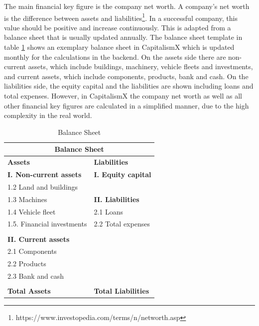 The main financial key figure is the company net worth. A company's net worth is the difference between assets and liabilities\footnote{https://www.investopedia.com/terms/n/networth.asp}. In a successful company, this value should be positive and increase continuously. This is adapted from a balance sheet that is usually updated annually. The balance sheet template in table \ref{tab:BalanceSheet} shows %
an exemplary balance sheet in CapitalismX which is updated monthly for the calculations in the backend. On the assets side there are non-current assets, which include buildings, machinery, vehicle fleets and investments, and current assets, which include components, products, bank and cash. On the liabilities side, the equity capital and the liabilities are shown including loans and total expenses. However, in CapitalismX the company net worth as well as all other financial key figures are calculated in a simplified manner, due to the high complexity in the real world.

\begin{table}[ht]
\label{tab:BalanceSheet}
\begin{tabular}{|p{5.9cm}|p{5.9cm}|}
\hline
\multicolumn{2}{|c|}{\textbf{Balance Sheet}}\\
\hline \textbf{Assets} & \textbf{Liabilities}\\ 
\hline \textbf{I. Non-current assets} & \textbf{I. Equity capital}\\
\hline 1.2 Land and buildings &\\
\hline 1.3 Machines & \textbf{II. Liabilities}\\
\hline 1.4 Vehicle fleet & 2.1 Loans\\
\hline 1.5. Financial investments &  2.2 Total expenses\\
\hline &\\
\hline \textbf{II. Current assets} &\\
\hline 2.1 Components &\\
\hline 2.2 Products &\\
\hline 2.3 Bank and cash &\\
\hline &\\
\hline \textbf{Total Assets} & \textbf{Total Liabilities}\\
\hline
\end{tabular}
\caption{Balance Sheet}
\end{table}

